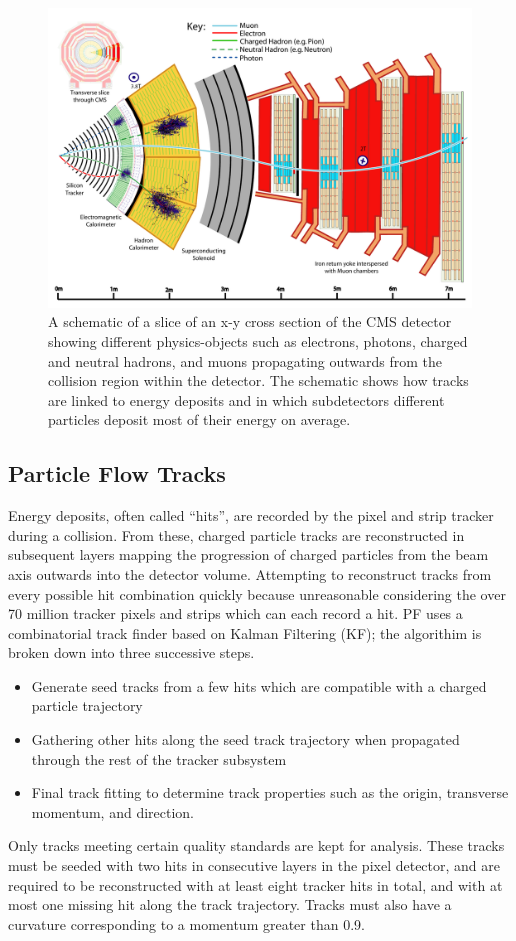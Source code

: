 \begin{figure}[htbp]
\centering
     \includegraphics[width=1.0\textwidth]{object_reconstruction_and_selection/plots/cms_slice.pdf}
     \caption{
A schematic of a slice of an x-y cross section of the CMS detector showing different
physics-objects such as electrons, photons, charged and neutral hadrons, and muons
propagating outwards from the collision region within the detector. The schematic
shows how tracks are linked to energy deposits and in which subdetectors different
particles deposit most of their energy on average.
     }
     \label{fig:cms_slice}
\end{figure}


\subsection{Particle Flow Tracks}
Energy deposits, often called ``hits'', are recorded by the pixel and strip tracker during
a collision. From these, charged particle tracks are reconstructed in subsequent layers
mapping the progression of charged particles from the beam axis outwards into the detector
volume. Attempting to reconstruct tracks from every possible hit combination quickly
because unreasonable considering the over 70 million tracker pixels and strips which can
each record a hit. PF uses a combinatorial track finder based on Kalman 
Filtering (KF); the algorithim is broken down into three successive steps.
\begin{itemize}
\item Generate seed tracks from a few hits which are compatible with a charged
particle trajectory
\item Gathering other hits along the seed track trajectory when propagated through
the rest of the tracker subsystem
\item Final track fitting to determine track properties such as the origin, transverse
momentum, and direction.
\end{itemize}
Only tracks meeting certain quality standards are kept for analysis. These tracks must
be seeded with two hits in consecutive layers in the pixel detector, and are required 
to be reconstructed with at least eight tracker hits in total, and with at most one 
missing hit along the track trajectory. Tracks must also have a curvature corresponding
to a momentum greater than 0.9\GeV.

